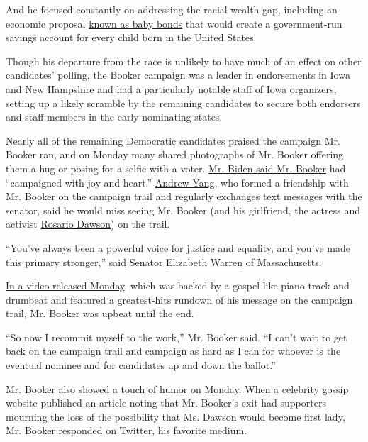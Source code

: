 And he focused constantly on addressing the racial wealth gap, including
an economic proposal
\href{https://www.nytimes3xbfgragh.onion/2019/04/06/us/politics/cory-booker-2020-baby-bonds.html}{known
as baby bonds} that would create a government-run savings account for
every child born in the United States.

Though his departure from the race is unlikely to have much of an effect
on other candidates' polling, the Booker campaign was a leader in
endorsements in Iowa and New Hampshire and had a particularly notable
staff of Iowa organizers, setting up a likely scramble by the remaining
candidates to secure both endorsers and staff members in the early
nominating states.

Nearly all of the remaining Democratic candidates praised the campaign
Mr. Booker ran, and on Monday many shared photographs of Mr. Booker
offering them a hug or posing for a selfie with a voter.
\href{https://twitter.com/JoeBiden/status/1216758302421352451}{Mr. Biden
said Mr. Booker} had ``campaigned with joy and heart.''
\href{https://www.nytimes3xbfgragh.onion/interactive/2020/us/elections/andrew-yang.html}{Andrew
Yang}, who formed a friendship with Mr. Booker on the campaign trail and
regularly exchanges text messages with the senator, said he would miss
seeing Mr. Booker (and his girlfriend, the actress and activist
\href{https://www.nytimes3xbfgragh.onion/2019/12/08/us/politics/rosario-dawson-cory-booker-iowa.html}{Rosario
Dawson}) on the trail.

``You've always been a powerful voice for justice and equality, and
you've made this primary stronger,''
\href{https://twitter.com/ewarren/status/1216760444951678977}{said}
Senator
\href{https://www.nytimes3xbfgragh.onion/interactive/2020/us/elections/elizabeth-warren.html}{Elizabeth
Warren} of Massachusetts.

\href{https://www.youtube.com/watch?v=VP6mNrhIBs8\&feature=emb_logo}{In
a video released Monday}, which was backed by a gospel-like piano track
and drumbeat and featured a greatest-hits rundown of his message on the
campaign trail, Mr. Booker was upbeat until the end.

``So now I recommit myself to the work,'' Mr. Booker said. ``I can't
wait to get back on the campaign trail and campaign as hard as I can for
whoever is the eventual nominee and for candidates up and down the
ballot.''

Mr. Booker also showed a touch of humor on Monday. When a celebrity
gossip website published an article noting that Mr. Booker's exit had
supporters mourning the loss of the possibility that Ms. Dawson would
become first lady, Mr. Booker responded on Twitter, his favorite medium.

